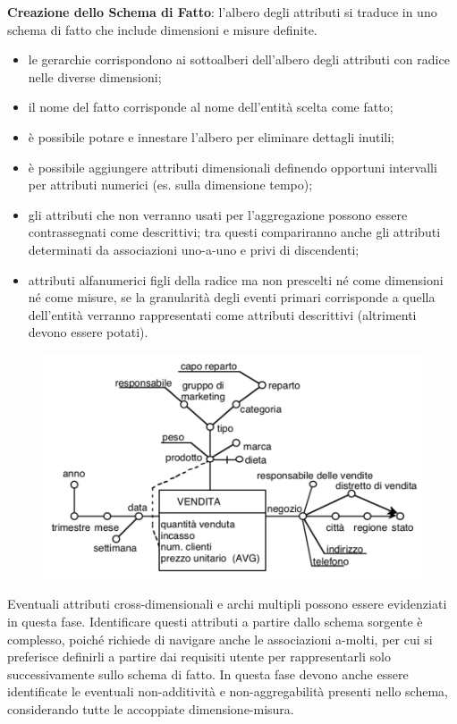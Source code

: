 \documentclass[a4paper, notitlepage, 9pt]{extreport}
\begin{document}
\noindent
\textbf{Creazione dello Schema di Fatto}: l’albero degli attributi si traduce in uno schema di fatto che include dimensioni e misure definite.
\begin{itemize}
	\item le gerarchie corrispondono ai sottoalberi dell’albero degli attributi con radice nelle diverse dimensioni;
	\item il nome del fatto corrisponde al nome dell’entità scelta come fatto;
	\item è possibile potare e innestare l’albero per eliminare dettagli inutili;
\end{itemize}
\begin{multicols}{2}
\begin{itemize}
	\item è possibile aggiungere attributi dimensionali definendo opportuni intervalli per attributi numerici (es. sulla dimensione tempo);
	\item gli attributi che non verranno usati per l’aggregazione possono essere contrassegnati come descrittivi; tra questi compariranno anche gli attributi determinati da associazioni uno-a-uno e privi di discendenti;
	\item attributi alfanumerici figli della radice ma non prescelti né come dimensioni né come misure, se la granularità degli eventi primari corrisponde a quella dell'entità verranno rappresentati come attributi descrittivi (altrimenti devono essere potati).
\end{itemize}
\columnbreak
\begin{figure}[H]
	\centering
	\includegraphics[scale=0.4]{Schema}
\end{figure}
\end{multicols}
\noindent
Eventuali attributi cross-dimensionali e archi multipli possono essere evidenziati in questa fase. Identificare questi attributi a partire dallo schema sorgente è complesso, poiché richiede di navigare anche le associazioni a-molti, per cui si preferisce definirli a partire dai requisiti utente per rappresentarli solo successivamente sullo schema di fatto. In questa fase devono anche essere identificate le eventuali non-additività e non-aggregabilità presenti nello schema, considerando tutte le accoppiate dimensione-misura.
\end{document}
